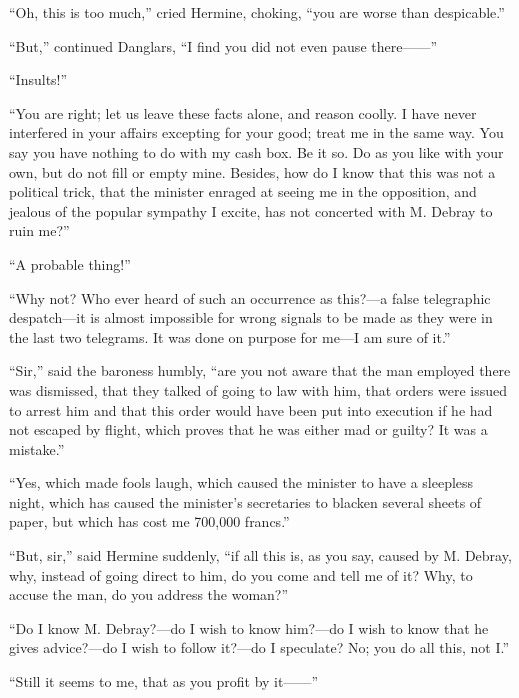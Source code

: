 “Oh, this is too much,” cried Hermine, choking, “you are worse than
despicable.”

“But,” continued Danglars, “I find you did not even pause there——”

“Insults!”

“You are right; let us leave these facts alone, and reason coolly. I
have never interfered in your affairs excepting for your good; treat me
in the same way. You say you have nothing to do with my cash box. Be it
so. Do as you like with your own, but do not fill or empty mine.
Besides, how do I know that this was not a political trick, that the
minister enraged at seeing me in the opposition, and jealous of the
popular sympathy I excite, has not concerted with M. Debray to ruin
me?”

“A probable thing!”

“Why not? Who ever heard of such an occurrence as this?—a false
telegraphic despatch—it is almost impossible for wrong signals to be
made as they were in the last two telegrams. It was done on purpose for
me—I am sure of it.”

“Sir,” said the baroness humbly, “are you not aware that the man
employed there was dismissed, that they talked of going to law with
him, that orders were issued to arrest him and that this order would
have been put into execution if he had not escaped by flight, which
proves that he was either mad or guilty? It was a mistake.”

“Yes, which made fools laugh, which caused the minister to have a
sleepless night, which has caused the minister’s secretaries to blacken
several sheets of paper, but which has cost me 700,000 francs.”

“But, sir,” said Hermine suddenly, “if all this is, as you say, caused
by M. Debray, why, instead of going direct to him, do you come and tell
me of it? Why, to accuse the man, do you address the woman?”

“Do I know M. Debray?—do I wish to know him?—do I wish to know that he
gives advice?—do I wish to follow it?—do I speculate? No; you do all
this, not I.”

“Still it seems to me, that as you profit by it——”

